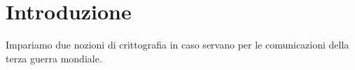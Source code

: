 \chapter{Introduzione}

Impariamo due nozioni di crittografia in caso servano per le comunicazioni della terza guerra mondiale.